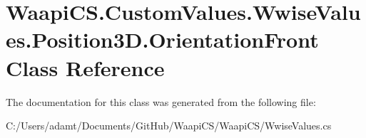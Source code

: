 \hypertarget{class_waapi_c_s_1_1_custom_values_1_1_wwise_values_1_1_position3_d_1_1_orientation_front}{}\section{Waapi\+C\+S.\+Custom\+Values.\+Wwise\+Values.\+Position3\+D.\+Orientation\+Front Class Reference}
\label{class_waapi_c_s_1_1_custom_values_1_1_wwise_values_1_1_position3_d_1_1_orientation_front}


The documentation for this class was generated from the following file\+:\begin{DoxyCompactItemize}
\item 
C\+:/\+Users/adamt/\+Documents/\+Git\+Hub/\+Waapi\+C\+S/\+Waapi\+C\+S/Wwise\+Values.\+cs\end{DoxyCompactItemize}
